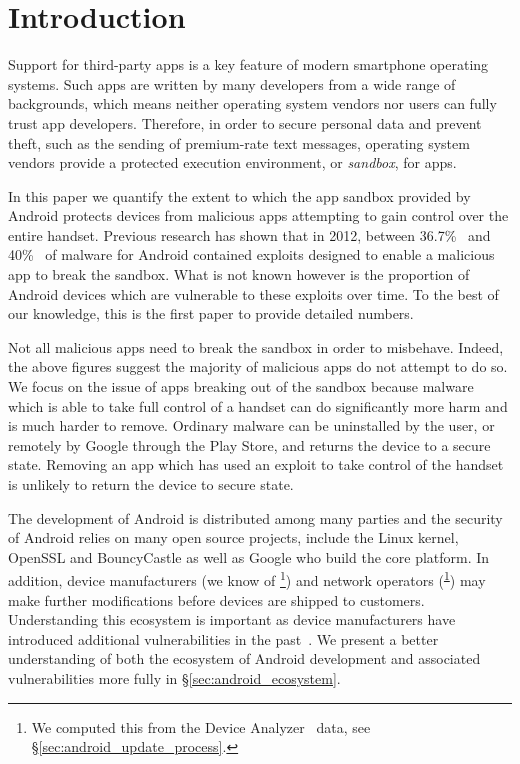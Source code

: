 \documentclass[conference,a4paper,twoside]{IEEEtran}
\newcommand{\da}{Device Analyzer}
\newcommand{\dafoot}{\textsuperscript{\ref{foot:dadata}}}
\newcommand{\percMarketShare}{83.6\%~\footnote{\url{http://www.theinquirer.net/inquirer/news/2379036/android-hits-836-percent-marketshare-while-ios-windows-and-blackberry-slide}}}
\begin{document}
\section{Introduction}

Support for third-party apps is a key feature of modern smartphone operating systems.
Such apps are written by many developers from a wide range of backgrounds, which means neither operating system vendors nor users can fully trust app developers.
Therefore, in order to secure personal data and prevent theft, such as the sending of premium-rate text messages, operating system vendors provide a protected execution environment, or \emph{sandbox}, for apps.

In this paper we quantify the extent to which the app sandbox provided by Android protects devices from malicious apps attempting to gain control over the entire handset.
Previous research has shown that in 2012, between 36.7\%~\cite{Zhou2012b} and 40\%~\cite{Zhou2012a} of malware for Android contained exploits designed to enable a malicious app to break the sandbox.
What is not known however is the proportion of Android devices which are vulnerable to these exploits over time.
To the best of our knowledge, this is the first paper to provide detailed numbers.

Not all malicious apps need to break the sandbox in order to misbehave.
Indeed, the above figures suggest the majority of malicious apps do not attempt to do so.
We focus on the issue of apps breaking out of the sandbox because malware which is able to take full control of a handset can do significantly more harm and is much harder to remove.
Ordinary malware can be uninstalled by the user, or remotely by Google through the Play Store, and returns the device to a secure state. 
Removing an app which has used an exploit to take control of the handset is unlikely to return the device to secure state.

The development of Android is distributed among many parties and the security of Android relies on many open source projects, include the Linux kernel, OpenSSL and BouncyCastle as well as Google who build the core platform. 
In addition, device manufacturers (we know of \daNumManufacturers\footnote{\label{foot:dadata}We computed this from the \da~\cite{Wagner2013} data, see \S\ref{sec:android_update_process}.}) and network operators (\daNumOperators\dafoot) may make further modifications before devices are shipped to customers. 
Understanding this ecosystem is important as device manufacturers have introduced additional vulnerabilities in the past~\cite{Grace2012}. 
We present a better understanding of both the ecosystem of Android development and associated vulnerabilities more fully in \S\ref{sec:android_ecosystem}.
 
\end{document}
